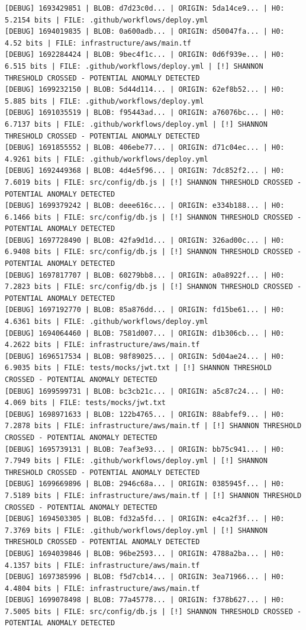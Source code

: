 \documentclass[12pt, a4paper, oneside]{report}
\begin{document}
\begin{lstlisting}[basicstyle=\tiny\ttfamily]
[DEBUG] 1693429851 | BLOB: d7d23c0d... | ORIGIN: 5da14ce9... | H0: 5.2154 bits | FILE: .github/workflows/deploy.yml
[DEBUG] 1694019835 | BLOB: 0a600adb... | ORIGIN: d50047fa... | H0: 4.52 bits | FILE: infrastructure/aws/main.tf
[DEBUG] 1692284424 | BLOB: 9bec4f1c... | ORIGIN: 0d6f939e... | H0: 6.515 bits | FILE: .github/workflows/deploy.yml | [!] SHANNON THRESHOLD CROSSED - POTENTIAL ANOMALY DETECTED
[DEBUG] 1699232150 | BLOB: 5d44d114... | ORIGIN: 62ef8b52... | H0: 5.885 bits | FILE: .github/workflows/deploy.yml
[DEBUG] 1691035519 | BLOB: f95443ad... | ORIGIN: a76076bc... | H0: 6.7137 bits | FILE: .github/workflows/deploy.yml | [!] SHANNON THRESHOLD CROSSED - POTENTIAL ANOMALY DETECTED
[DEBUG] 1691855552 | BLOB: 406ebe77... | ORIGIN: d71c04ec... | H0: 4.9261 bits | FILE: .github/workflows/deploy.yml
[DEBUG] 1692449368 | BLOB: 4d4e5f96... | ORIGIN: 7dc852f2... | H0: 7.6019 bits | FILE: src/config/db.js | [!] SHANNON THRESHOLD CROSSED - POTENTIAL ANOMALY DETECTED
[DEBUG] 1699379242 | BLOB: deee616c... | ORIGIN: e334b188... | H0: 6.1466 bits | FILE: src/config/db.js | [!] SHANNON THRESHOLD CROSSED - POTENTIAL ANOMALY DETECTED
[DEBUG] 1697728490 | BLOB: 42fa9d1d... | ORIGIN: 326ad00c... | H0: 6.9408 bits | FILE: src/config/db.js | [!] SHANNON THRESHOLD CROSSED - POTENTIAL ANOMALY DETECTED
[DEBUG] 1697817707 | BLOB: 60279bb8... | ORIGIN: a0a8922f... | H0: 7.2823 bits | FILE: src/config/db.js | [!] SHANNON THRESHOLD CROSSED - POTENTIAL ANOMALY DETECTED
[DEBUG] 1697192770 | BLOB: 85a876dd... | ORIGIN: fd15be61... | H0: 4.6361 bits | FILE: .github/workflows/deploy.yml
[DEBUG] 1694064460 | BLOB: 7581d007... | ORIGIN: d1b306cb... | H0: 4.2622 bits | FILE: infrastructure/aws/main.tf
[DEBUG] 1696517534 | BLOB: 98f89025... | ORIGIN: 5d04ae24... | H0: 6.9035 bits | FILE: tests/mocks/jwt.txt | [!] SHANNON THRESHOLD CROSSED - POTENTIAL ANOMALY DETECTED
[DEBUG] 1699599731 | BLOB: bc3cb21c... | ORIGIN: a5c87c24... | H0: 4.069 bits | FILE: tests/mocks/jwt.txt
[DEBUG] 1698971633 | BLOB: 122b4765... | ORIGIN: 88abfef9... | H0: 7.2878 bits | FILE: infrastructure/aws/main.tf | [!] SHANNON THRESHOLD CROSSED - POTENTIAL ANOMALY DETECTED
[DEBUG] 1695739131 | BLOB: 7eaf3e93... | ORIGIN: bb75c941... | H0: 7.7949 bits | FILE: .github/workflows/deploy.yml | [!] SHANNON THRESHOLD CROSSED - POTENTIAL ANOMALY DETECTED
[DEBUG] 1699669896 | BLOB: 2946c68a... | ORIGIN: 0385945f... | H0: 7.5189 bits | FILE: infrastructure/aws/main.tf | [!] SHANNON THRESHOLD CROSSED - POTENTIAL ANOMALY DETECTED
[DEBUG] 1694503305 | BLOB: fd32a5fd... | ORIGIN: e4ca2f3f... | H0: 7.3769 bits | FILE: .github/workflows/deploy.yml | [!] SHANNON THRESHOLD CROSSED - POTENTIAL ANOMALY DETECTED
[DEBUG] 1694039846 | BLOB: 96be2593... | ORIGIN: 4788a2ba... | H0: 4.1357 bits | FILE: infrastructure/aws/main.tf
[DEBUG] 1697385996 | BLOB: f5d7cb14... | ORIGIN: 3ea71966... | H0: 4.4804 bits | FILE: infrastructure/aws/main.tf
[DEBUG] 1699078498 | BLOB: 77a45778... | ORIGIN: f378b627... | H0: 7.5005 bits | FILE: src/config/db.js | [!] SHANNON THRESHOLD CROSSED - POTENTIAL ANOMALY DETECTED
\end{lstlisting}
\end{document}
